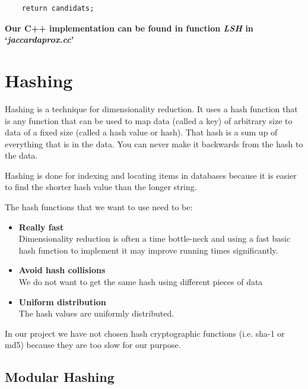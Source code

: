 \documentclass[12pt]{article}
\begin{document}
{\begin{lstlisting}
    return candidats;

 \end{lstlisting}

\bigskip
\textbf{Our C++ implementation can be found in function \textit{LSH} in `\textit{jaccardaprox.cc}'}
\newline
 
\section{Hashing} \label{hashing}

Hashing is a technique for dimensionality reduction. It uses a hash function that is any function that can be used to map data (called a key) of arbitrary size to data of a fixed size (called a hash value or hash). That hash is a sum up of everything that is in the data. You can never make it backwards from the hash to the data.

Hashing is done for indexing and locating items in databases because it is easier to find the shorter hash value than the longer string.

The hash functions that we want to use need to be: 

\begin{itemize}
\item \textbf{Really fast}\\
Dimensionality reduction is often a time bottle-neck and using a fast basic hash function to implement it may improve running times significantly. 
\item \textbf{Avoid hash collisions}\\
We do not want to get the same hash using different pieces of data %
\item \textbf{Uniform distribution}\\
The hash values are uniformly distributed.

\end{itemize}

In our project we have not chosen hash cryptographic functions (i.e. sha-1 or md5) because they are too slow for our purpose.

\subsection{Modular Hashing}

}
\end{document}
